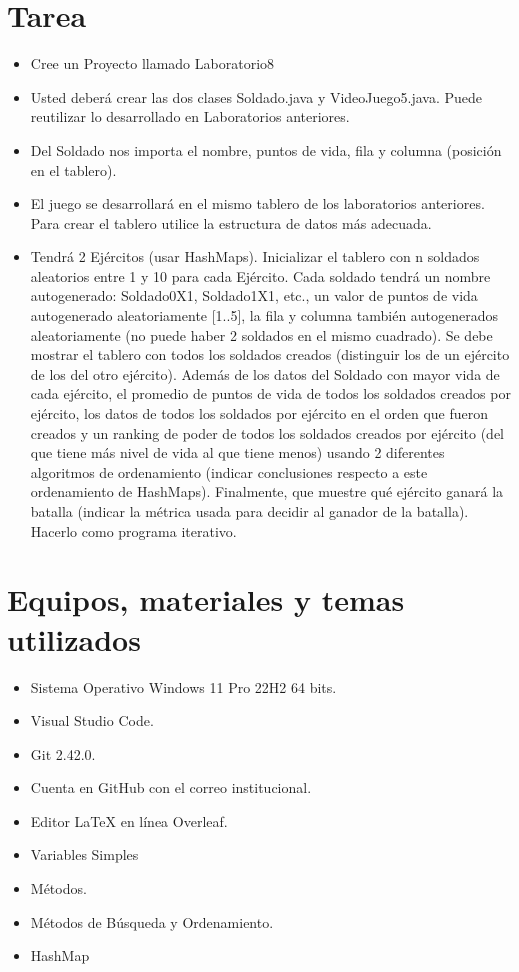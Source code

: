 \documentclass{article}
\begin{document}

	\section{Tarea}
	\begin{itemize}		
        \item Cree un Proyecto llamado Laboratorio8
        \item Usted deberá crear las dos clases Soldado.java y VideoJuego5.java. Puede reutilizar lo desarrollado en Laboratorios anteriores.
        \item Del Soldado nos importa el nombre, puntos de vida, fila y columna (posición en el tablero).
        \item El juego se desarrollará en el mismo tablero de los laboratorios anteriores. Para crear el tablero utilice la estructura de datos más adecuada.
        \item Tendrá 2 Ejércitos (usar HashMaps). Inicializar el tablero con n soldados aleatorios entre 1 y 10 para cada Ejército. Cada soldado tendrá un nombre autogenerado: Soldado0X1, Soldado1X1, etc., un valor de puntos de vida autogenerado aleatoriamente [1..5], la fila y columna también autogenerados aleatoriamente (no puede haber 2 soldados en el mismo cuadrado). Se debe mostrar el tablero con todos los soldados creados (distinguir los de un ejército de los del otro ejército). Además de los datos del Soldado con mayor vida de cada ejército, el promedio de puntos de vida de todos los soldados creados por ejército, los datos de todos los soldados por ejército en el orden que fueron creados y un ranking de poder de todos los soldados creados por ejército (del que tiene más nivel de vida al que tiene menos) usando 2 diferentes algoritmos de ordenamiento (indicar conclusiones respecto a este ordenamiento de HashMaps). Finalmente, que muestre qué ejército ganará la batalla (indicar la métrica usada para decidir al ganador de la batalla). Hacerlo como programa iterativo.

	\end{itemize}
		
	\section{Equipos, materiales y temas utilizados}
	\begin{itemize}
		\item Sistema Operativo Windows 11 Pro 22H2 64 bits.
		\item Visual Studio Code.
		\item Git 2.42.0.
		\item Cuenta en GitHub con el correo institucional.
        \item Editor LaTeX en línea Overleaf.
        \item Variables Simples
        \item Métodos.
        \item Métodos de Búsqueda y Ordenamiento.
        \item HashMap
        
        
	\end{itemize}
	
\end{document}
